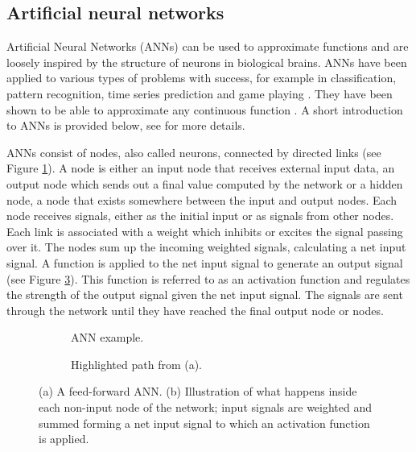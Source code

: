 \subsection{Artificial neural networks}
Artificial Neural Networks (ANNs) can be used to approximate functions and are loosely inspired by the structure
of neurons in biological brains. ANNs have been applied to various types of problems with success, for example
in classification, pattern recognition, time series prediction and game playing \cite{go_net}.
They have been shown to be able to approximate any continuous function \cite{universality_formal}.
A short introduction to ANNs is provided below, see \cite{compint} for more details.

ANNs consist of nodes, also called neurons, connected by directed links (see Figure \ref{feedforward}).
A node is either an input node that receives external input data, an output node which sends out a final value computed
by the network or a hidden node, a node that exists somewhere between the input and output nodes. Each node receives signals, either
as the initial input or as signals from other nodes. Each link is associated with a weight which inhibits or excites the signal
passing over it. The nodes sum up the incoming weighted signals, calculating a net input signal. A function is applied to the net input
signal to generate an output signal (see Figure \ref{neuron}). This function is referred to as an activation function and regulates the strength of the output
signal given the net input signal. The signals are sent through the network until they have reached the final output node or nodes.


\begin{figure}[htb]
    \begin{mdframed}
        \begin{subfigure}[b]{0.5\textwidth}
            \centering
            \resizebox{0.7\textwidth}{!}{}
            \caption{ANN example.}
            \label{feedforward}
        \end{subfigure}
        \begin{subfigure}[b]{0.5\textwidth}
            \centering
            \resizebox{0.9\textwidth}{!}{}
            \caption{Highlighted path from (a).}
            \label{neuron}
        \end{subfigure}
    \end{mdframed}
    \caption{(a) A feed-forward ANN. (b) Illustration of what happens inside each non-input node of the network; input
                 signals are weighted and summed forming a net input signal to which an activation function is applied.}
\end{figure}


